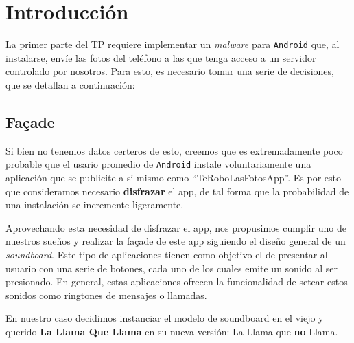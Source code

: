 \documentclass[10pt, a4paper,english,spanish]{article}
\renewcommand{\emph}[1]{\textit{#1}}
\begin{document}

\maketitle
\pagebreak

\tableofcontents
\pagebreak

\section{Introducción} %
\label{sec:introducci_n}

La primer parte del TP requiere implementar un \emph{malware} para \texttt{Android} que, al instalarse, envíe las fotos del teléfono a las que tenga acceso a un servidor controlado por nosotros. Para esto, es necesario tomar una serie de decisiones, que se detallan a continuación:

\subsection{Façade} %
\label{sub:fa_ade}
Si bien no tenemos datos certeros de esto, creemos que es extremadamente poco probable que el usario promedio de \texttt{Android} instale voluntariamente una aplicación que se publicite a si mismo como ``TeRoboLasFotosApp''. Es por esto que consideramos necesario \textbf{disfrazar} el app, de tal forma que la probabilidad de una instalación se incremente ligeramente. 

Aprovechando esta necesidad de disfrazar el app, nos propusimos cumplir uno de nuestros sueños y realizar la façade de este app siguiendo el diseño general de un \textit{soundboard}. Este tipo de aplicaciones tienen como objetivo el de presentar al usuario con una serie de botones, cada uno de los cuales emite un sonido al ser presionado. En general, estas aplicaciones ofrecen la funcionalidad de setear estos sonidos como ringtones de mensajes o llamadas.

En nuestro caso decidimos instanciar el modelo de soundboard en el viejo y querido \textbf{La Llama Que Llama} en su nueva versión: La Llama que \textbf{no} Llama.
\end{document}
